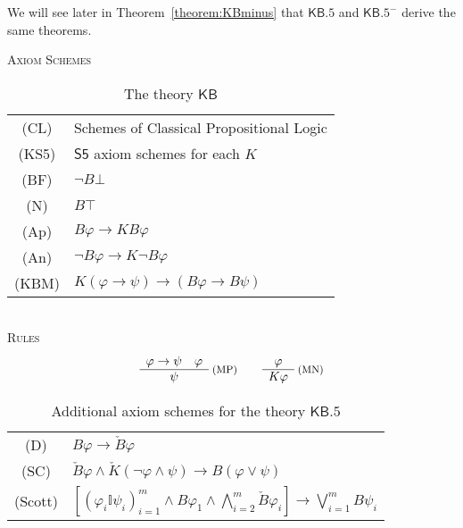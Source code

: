 \documentclass[12pt]{article}
\theoremstyle{definition}
\newcommand{\KB}{{\mathsf{KB}}}                 %
\newcommand{\KBeq}{{\mathsf{KB.5}}}             %
\newcommand{\KBeqm}{{\mathsf{KB.5}}^{-}}        %
\begin{document}
We will see later in Theorem~\ref{theorem:KBminus} that $\KBeq$ and
$\KBeqm$ derive the same theorems.

\begin{table}[ht]
  \begin{center}
    \textsc{Axiom Schemes}\\[.4em]
    \renewcommand{\arraystretch}{1.3}
    \begin{tabular}[t]{cl}
      (CL) &
      Schemes of Classical Propositional Logic
      \\
      (KS5) &
      $\mathsf{S5}$ axiom schemes for each $K$
      \\
      (BF) &
      $\lnot B\bot$
      \\
      (N) &
      $B\top$
      \\
      (Ap) &
      $B\varphi\to KB\varphi$
      \\
      (An) &
      $\lnot B\varphi\to K\lnot B\varphi$
      \\
      (KBM) &
      $K(\varphi\to\psi)\to(B\varphi\to B\psi)$
    \end{tabular}
    \renewcommand{\arraystretch}{1.0}
    \\[1em]
    \textsc{Rules}\vspace{-.5em}
    \[
    \begin{array}{c}
      \varphi\to\psi \quad \varphi
      \\\hline
      \psi
    \end{array}\;\text{\footnotesize(MP)}
    \qquad
    \begin{array}{c}
      \varphi
      \\\hline
      K\varphi
    \end{array}\;\text{\footnotesize(MN)}
    \]
  \end{center}
  \caption{The theory $\KB$}
  \label{table:KB}
\end{table}

\begin{table}[ht]
  \begin{center}
    \renewcommand{\arraystretch}{1.3}
    \begin{tabular}[t]{cl}
      (D) &
      $B\varphi\to \check B\varphi$
      \\
      (SC) &
      $\check B\varphi \land 
      \check K(\lnot\varphi\land\psi) \to 
      B(\varphi\lor\psi)$
      \\
      (Scott) &
      $\textstyle [(\varphi_i\mathbb{I}\psi_i)_{i=1}^m
      \land B\varphi_1 \land \bigwedge_{i=2}^m \check B\varphi_i] \to
      \bigvee_{i=1}^m B\psi_i$
    \end{tabular}
  \end{center}
  \caption{Additional axiom schemes for the theory $\KBeq$}
  \label{table:additional-schemes}
\end{table}
\end{document}
